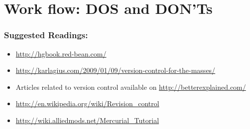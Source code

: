 \documentclass[14pt,compress]{beamer}
\begin{document}
\section{Work flow: DOS and DON'Ts}

\begin{frame}
  \frametitle{Suggested Readings:}
  \begin{itemize}
  \item \url{http://hgbook.red-bean.com/}
  \item \url{http://karlagius.com/2009/01/09/version-control-for-the-masses/}
  \item Articles related to version control available on \url{http://betterexplained.com/}
  \item \url{http://en.wikipedia.org/wiki/Revision_control}
  \item \url{http://wiki.alliedmods.net/Mercurial_Tutorial}
  \end{itemize}
\end{frame}
\end{document}
